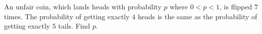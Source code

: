 An unfair coin, which lands heads with probability $p$ where $0<p<1$, is flipped $7$ times. The probability of getting exactly $4$ heads is the same as the probability of getting exactly $5$ tails. Find $p$.
